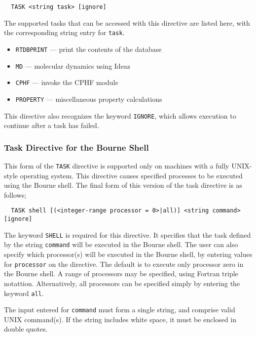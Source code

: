 \begin{verbatim}
  TASK <string task> [ignore]
\end{verbatim}

The supported tasks that can be accessed with this directive are listed
here, with the corresponding string entry for \verb+task+.

\begin{itemize}
  \item \verb+RTDBPRINT+ --- print the contents of the database
  \item \verb+MD+ --- molecular dynamics using Ideaz
  \item \verb+CPHF+ --- invoke the CPHF module
  \item \verb+PROPERTY+ --- miscellaneous property calculations
\end{itemize}

This directive also recognizes the keyword \verb+IGNORE+, which allows
execution to continue after a task has failed.

\subsubsection{Task Directive for the Bourne Shell}

This form of the \verb+TASK+ directive is supported only on machines 
with a fully UNIX-style operating system.  This directive causes specified
processes to be executed using the Bourne shell.  The final form of this
version of the task directive is as follows;

\begin{verbatim}
  TASK shell [(<integer-range processor = 0>|all)] <string command> [ignore]
\end{verbatim}

The keyword \verb+SHELL+ is required for this directive.  It specifies
that the task defined by the string \verb+command+ will be executed in
the Bourne shell.  The user can also specify which processor(s) will be
executed in the Bourne shell, by entering values for \verb+processor+ on
the directive.  The default is to execute only processor zero in the 
Bourne shell.  A range of processors may be specified, using Fortran
triple notattion.  Alternatively, all processors can be specified simply
by entering the keyword
\verb+all+.

The input entered for \verb+command+ must form a single string, and comprise
valid UNIX command(s).  If the string includes white space, it must be 
enclosed in double quotes.

